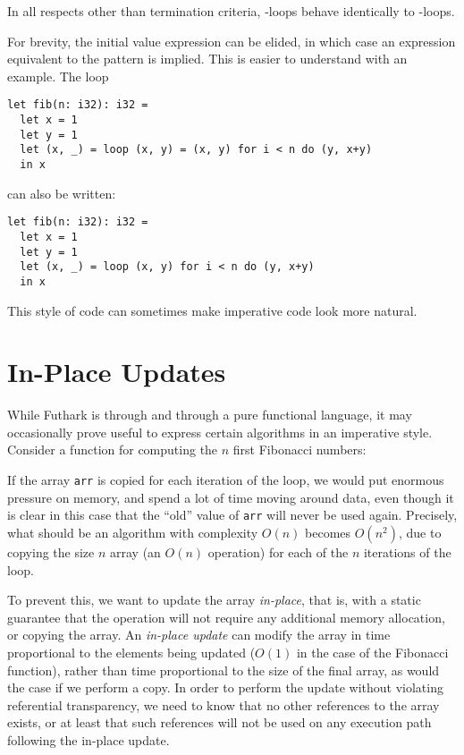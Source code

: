 \documentclass[oneside,11pt]{book}
\newenvironment{wrap}{\vspace{\topskip}\par\noindent\begin{minipage}{\linewidth}}{\end{minipage}\par}
\newcommand{\inplisting}[1]{\begin{wrap}\end{wrap}}
\begin{document}
\noindent
In all respects other than termination criteria, -loops
behave identically to -loops.

For brevity, the initial value expression can be elided, in which case
an expression equivalent to the pattern is implied.  This is easier to
understand with an example.  The loop

\begin{lstlisting}
let fib(n: i32): i32 =
  let x = 1
  let y = 1
  let (x, _) = loop (x, y) = (x, y) for i < n do (y, x+y)
  in x
\end{lstlisting}

\noindent
can also be written:

\begin{lstlisting}
let fib(n: i32): i32 =
  let x = 1
  let y = 1
  let (x, _) = loop (x, y) for i < n do (y, x+y)
  in x
\end{lstlisting}

\noindent
This style of code can sometimes make imperative code look more natural.

\section{In-Place Updates}
\label{sec:in-place-updates}

While Futhark is through and through a pure functional language, it
may occasionally prove useful to express certain algorithms in an
imperative style.  Consider a function for computing the $n$ first
Fibonacci numbers:

\inplisting{src/fib_sequential.fut}

If the array \texttt{arr} is copied for each iteration of the loop, we
would put enormous pressure on memory, and spend a lot of time moving
around data, even though it is clear in this case that the ``old''
value of \texttt{arr} will never be used again.  Precisely, what
should be an algorithm with complexity $O(n)$ becomes $O(n^2)$, due to
copying the size $n$ array (an $O(n)$ operation) for each of the $n$
iterations of the loop.

To prevent this, we want to update the array \textit{in-place}, that
is, with a static guarantee that the operation will not require any
additional memory allocation, or copying the array.  An
\textit{in-place update} can modify the array in time proportional to
the elements being updated ($O(1)$ in the case of the Fibonacci
function), rather than time proportional to the size of the final
array, as would the case if we perform a copy.  In order to perform
the update without violating referential transparency, we need to know
that no other references to the array exists, or at least that such
references will not be used on any execution path following the
in-place update.
\end{document}
